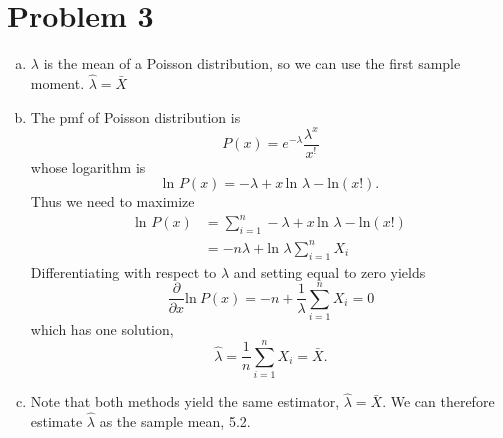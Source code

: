 \documentclass[11pt]{article}
\begin{document}
\section*{Problem 3}

\begin{enumerate}[(a)]
	\item $\lambda$ is the mean of a Poisson distribution, so we can use the first sample moment. $\hat{\lambda} = \bar{X}$

	\item The pmf of Poisson distribution is
	\[P(x) = e^{-\lambda} \dfrac{\lambda^x}{x^!} \]
	whose logarithm is
	\[\text{ln } P(x) = -\lambda + x\, \text{ln } \lambda -  \text{ln}(x!).\]
	Thus we need to maximize
	\begin{align*}
		\text{ln } P(x) &= \sum \limits _{i=1} ^n -\lambda + x\, \text{ln } \lambda -  \text{ln}(x!) \\
		&= -n\lambda + \text{ln } \lambda \sum \limits _{i=1} ^n X_i
	\end{align*}
	Differentiating with respect to $\lambda$ and setting equal to zero yields
	\[\frac{\partial}{\partial x} \text{ln}\ P(x) = -n + \frac{1}{\lambda} \sum \limits _{i=1} ^n X_i = 0 \]
	which has one solution,
	\[ \hat{\lambda} = \frac{1}{n} \sum \limits _{i=1} ^n X_i = \bar{X}. \]

	\item Note that both methods yield the same estimator, $\hat{\lambda} = \bar{X}$. We can therefore estimate $\hat{\lambda}$ as the sample mean, 5.2.


\end{enumerate}
\end{document}
